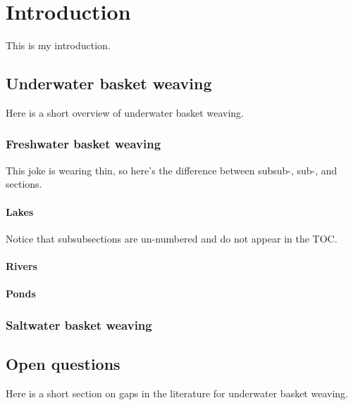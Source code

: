 \chapter{Introduction}

This is my introduction.

\section{Underwater basket weaving}

Here is a short overview of underwater basket weaving.

\subsection{Freshwater basket weaving}

This joke is wearing thin, so here's the difference between subsub-, sub-, and sections.

\subsubsection{Lakes}
Notice that subsubsections are un-numbered and do not appear in the TOC.
\subsubsection{Rivers}
\subsubsection{Ponds}

\subsection{Saltwater basket weaving}

\section{Open questions}

Here is a short section on gaps in the literature for underwater basket weaving.
